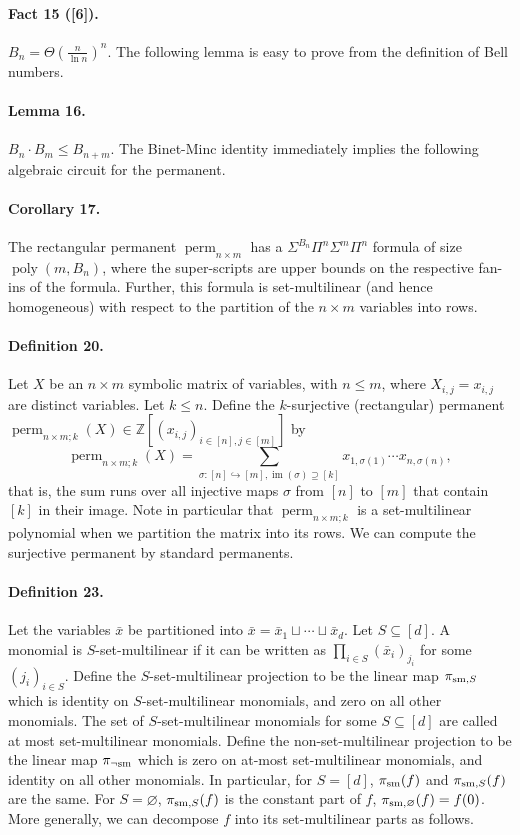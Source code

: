 \paragraph{Fact 15 ([6]).} $B_n=\Theta(\frac n{\ln n})^n$.
The following lemma is easy to prove from the definition of Bell numbers.
\paragraph{Lemma 16.} $B_n\cdot B_m\le B_{n+m}$.
The Binet-Minc identity immediately implies the following algebraic circuit for the permanent.
\paragraph{Corollary 17.} The rectangular permanent $\operatorname{perm}_{n\times m}$ has a $\Sigma^{B_n}\Pi^n\Sigma^m\Pi^n$ formula of size $\operatorname{poly}(m,B_n)$, where the super-scripts are upper bounds on the respective fan-ins of the formula. Further, this formula is set-multilinear (and hence homogeneous) with respect to the partition of the $n\times m$ variables into rows.
\paragraph{Definition 20.} Let $X$ be an $n\times m$ symbolic matrix of variables, with $n\le m$, where $X_{i,j}=x_{i,j}$ are distinct variables. Let $k\le n$. Define the $k$-surjective (rectangular) permanent $\operatorname{perm}_{n\times m;k}(X)\in\mathbb Z[(x_{i,j})_{i\in[n],j\in[m]}]$ by
\[\operatorname{perm}_{n\times m;k}(X)=\sum_{\sigma:[n]\hookrightarrow[m],\operatorname{im}(\sigma)\supseteq[k]}x_{1,\sigma(1)}\cdots x_{n,\sigma(n)},\]
that is, the sum runs over all injective maps $\sigma$ from $[n]$ to $[m]$ that contain $[k]$ in their image.
Note in particular that $\operatorname{perm}_{n\times m;k}$ is a set-multilinear polynomial when we partition the matrix into its rows.
We can compute the surjective permanent by standard permanents.
\paragraph{Definition 23.} Let the variables $\bar x$ be partitioned into $\bar x=\bar x_1\sqcup\cdots\sqcup\bar x_d$.
Let $S\subseteq[d]$. A monomial is $S$-set-multilinear if it can be written as $\prod_{i\in S}(\bar x_i)_{j_i}$ for some $(j_i)_{i\in S}$. Define the $S$-set-multilinear projection to be the linear map $\pi_{{\rm sm},S}$ which is identity on $S$-set-multilinear monomials, and zero on all other monomials.
The set of $S$-set-multilinear monomials for some $S\subseteq[d]$ are called at most set-multilinear monomials. Define the non-set-multilinear projection to be the linear map $\pi_{\neg{\rm sm}}$ which is zero on at-most set-multilinear monomials, and identity on all other monomials.
In particular, for $S=[d]$, $\pi_{\rm sm}(f)$ and $\pi_{{\rm sm},S}(f)$ are the same. For $S=\varnothing$, $\pi_{{\rm sm},S}(f)$ is the constant part of $f$, $\pi_{{\rm sm},\varnothing}(f)=f(0)$. More generally, we can decompose $f$ into its set-multilinear parts as follows.
